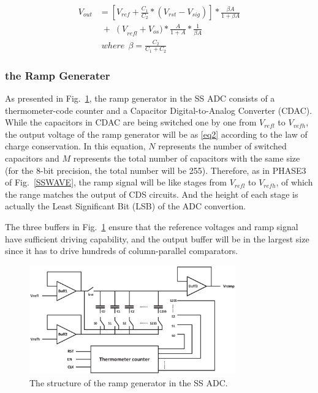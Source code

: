 \begin{equation}
	\begin{aligned}
		V_{out}&=\left[ V_{ref}+\frac{C_1}{C_2}\ast\left(V_{rst}-V_{sig}\right)\right]\ast\frac{\beta A}{1+\beta A}\\
		&\;{+}\;\left(V\right._{refl}+V_{os})\ast\frac{A}{1+A}\ast\frac{1}{\beta A}\\
		&\;where\ \ \beta=\frac{C_2}{C_1+C_2}
		\label{eq1}
	\end{aligned}
\end{equation}

\subsubsection{the Ramp Generater}

As presented in Fig.~\ref{RAMP}, the ramp generator in the SS ADC consists of a thermometer-code counter and a Capacitor Digital-to-Analog Converter (CDAC). 
While the capacitors in CDAC are being switched one by one from $V_{refl}$ to $V_{vefh}$, the output voltage of the ramp generator will be as \eqref{eq2} according to the law of charge conservation. 
In this equation, $N$ represents the number of switched capacitors and $M$ represents the total number of capacitors with the same size (for the 8-bit precision, the total number will be 255). 
Therefore, as in PHASE3 of Fig.~\ref{SSWAVE}, the ramp signal will be like stages from $V_{refl}$ to $V_{refh}$, of which the range matches the output of CDS circuits. 
And the height of each stage is actually the Least Significant Bit (LSB) of the ADC convertion.

The three buffers in Fig.~\ref{RAMP} ensure that the reference voltages and ramp signal have sufficient driving capability, 
and the output buffer will be in the largest size since it has to drive hundreds of column-parallel comparators.

\begin{figure}[htbp]
	\centerline{\includegraphics[width=3.5in]{./Figures/RAMP.eps}}
	\caption{The structure of the ramp generator in the SS ADC.}
	\label{RAMP}
\end{figure} 

